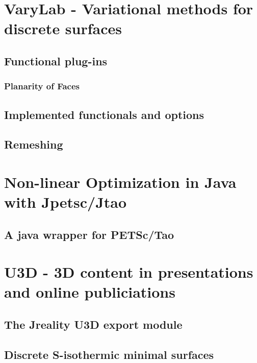 \documentclass[Thesis.tex]{subfiles}
\begin{document}
\chapter{{\sc VaryLab} - Variational methods for discrete surfaces}
\label{sec:varylab}

\section{Functional plug-ins}

\subsection{Planarity of Faces}



\section{Implemented functionals and options}
\section{Remeshing}

\chapter{Non-linear Optimization in {\sc Java} with {\sc Jpetsc/Jtao}}
\label{sec:jpetsctao}

\section{A java wrapper for {\sc PETSc/Tao}}

\chapter{{\sc U3D} - 3D content in presentations and online publiciations}
\label{sec:u3d}
\section{The {\sc Jreality} U3D export module}
\section{Discrete S-isothermic minimal surfaces}

\subfilebibliography
\end{document}
